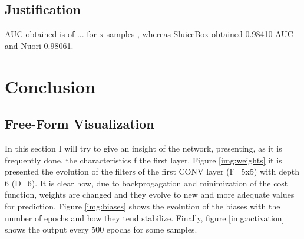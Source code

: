 \documentclass[]{article}
\begin{document}
\subsection{Justification}\label{justification}

AUC obtained is of ... for x samples , whereas SluiceBox obtained 0.98410 AUC and Nuori 0.98061.


\section{Conclusion}\label{v.-conclusion}


\subsection{Free-Form Visualization}\label{free-form-visualization}

\newcommand{\lr}{0.0005}
In this section I will try to give an insight of the network, presenting, as it is frequently done, the characteristics f the first layer. Figure \ref{img:weights} it is presented the evolution of the filters of the first CONV layer (F=5x5) with depth 6 (D=6). It is clear how, due to backprogagation and minimization of the cost function, weights are changed and they evolve to new and more adequate values for prediction.
Figure \ref{img:biases} shows the evolution of the biases with the number of epochs and how they tend stabilize. Finally, figure \ref{img:activation} shows the output every 500 epochs for some samples.
\end{document}
